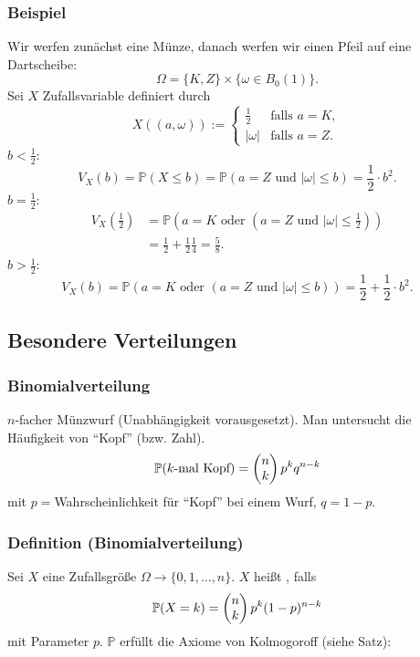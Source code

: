 \subsubsection{Beispiel}
Wir werfen zun\"achst eine M\"unze, danach werfen wir einen Pfeil auf eine Dartscheibe:
\[
\Omega=\{K,Z\}\times\{\omega\in B_0(1)\}.
\]
Sei $X$ Zufallsvariable definiert durch
\[
X((a,\omega)):=
\begin{cases}
\frac{1}{2}&\text{falls }a=K,\\
|\omega|&\text{falls }a=Z.
\end{cases}
\]
$b<\frac{1}{2}$:
\[
V_X(b)=\mathbb{P}(X\leq b)=\mathbb{P}(a=Z\text{ und }|\omega|\leq b)=\frac{1}{2}\cdot b^2.
\]
$b=\frac{1}{2}$:
\begin{align*}
V_X(\frac{1}{2})&=\mathbb{P}(a=K\text{ oder }(a=Z\text{ und }|\omega|\leq\frac{1}{2}))\\
&=\frac{1}{2}+\frac{1}{2}\frac{1}{4}=\frac{5}{8}.
\end{align*}
$b>\frac{1}{2}$:
\[
V_X(b)=\mathbb{P}(a=K\text{ oder }(a=Z\text{ und }|\omega|\leq b))=\frac{1}{2}+\frac{1}{2}\cdot b^2.
\]
\subsection{Besondere Verteilungen}
\subsubsection{Binomialverteilung}
$n$-facher M\"unzwurf (Unabh\"angigkeit vorausgesetzt). Man untersucht die H\"aufigkeit von ``Kopf'' (bzw. Zahl).
\[
\mathbb{P}(k\text{-mal Kopf})=\begin{pmatrix}n\\k\end{pmatrix}p^kq^{n-k}
\]
mit $p=$Wahrscheinlichkeit f\"ur ``Kopf'' bei einem Wurf, $q=1-p$.
\subsubsection{Definition (Binomialverteilung)}
Sei $X$ eine Zufallsgr\"o\ss{}e $\Omega\to\{0,1,\ldots,n\}$. $X$ hei\ss{}t , falls
\[
\mathbb{P}(X=k)=\begin{pmatrix}n\\k\end{pmatrix}p^k(1-p)^{n-k}
\]
mit Parameter $p$. $\mathbb{P}$ erf\"ullt die Axiome von Kolmogoroff (siehe Satz):
